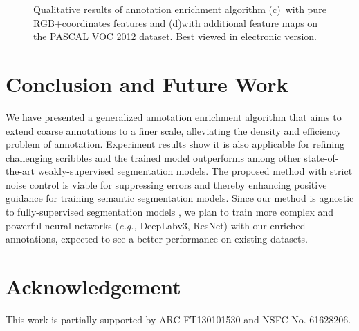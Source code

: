\documentclass[sigconf]{acmart}
\begin{document}
\begin{figure*}[htb!]
{\begin{minipage}[b]{0.25\textwidth}
		\end{minipage}
	}
	\caption{Qualitative results of annotation enrichment algorithm (c)~with pure RGB+coordinates features and (d)with additional feature maps on the PASCAL VOC 2012 dataset. Best viewed in electronic version.}
	\label{fig:color}
\end{figure*}



\section{Conclusion and Future Work}
We have presented a generalized annotation enrichment algorithm that aims to extend coarse annotations to a finer scale, alleviating the density and efficiency problem of annotation. Experiment results show it is also applicable for refining challenging scribbles and the trained model outperforms among other state-of-the-art weakly-supervised segmentation models. The proposed method with strict noise control is viable for suppressing errors and thereby enhancing positive guidance for training semantic segmentation models. Since our method is agnostic to fully-supervised segmentation models , we plan to train more complex and powerful neural networks (\textit{e.g.,} DeepLabv3, ResNet) with our enriched annotations, expected to see a better performance on existing datasets.

\section{Acknowledgement}
This work is partially supported by ARC FT130101530 and NSFC No. 61628206.

\newpage



\end{document}

